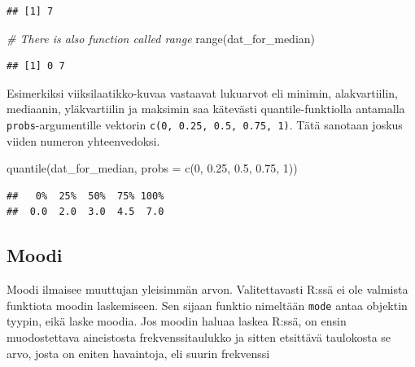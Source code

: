 \documentclass[
]{book}
\newenvironment{Shaded}{\begin{snugshade}}{\end{snugshade}}
\newcommand{\AttributeTok}[1]{\textcolor[rgb]{0.77,0.63,0.00}{#1}}
\newcommand{\CommentTok}[1]{\textcolor[rgb]{0.56,0.35,0.01}{\textit{#1}}}
\newcommand{\DecValTok}[1]{\textcolor[rgb]{0.00,0.00,0.81}{#1}}
\newcommand{\FloatTok}[1]{\textcolor[rgb]{0.00,0.00,0.81}{#1}}
\newcommand{\FunctionTok}[1]{\textcolor[rgb]{0.00,0.00,0.00}{#1}}
\newcommand{\NormalTok}[1]{#1}
\begin{document}
\begin{verbatim}
## [1] 7
\end{verbatim}

\begin{Shaded}
\begin{Highlighting}[]
\CommentTok{\# There is also function called range}
\FunctionTok{range}\NormalTok{(dat\_for\_median)}
\end{Highlighting}
\end{Shaded}

\begin{verbatim}
## [1] 0 7
\end{verbatim}

Esimerkiksi viiksilaatikko-kuvaa vastaavat lukuarvot eli minimin, alakvartiilin, mediaanin, yläkvartiilin ja maksimin saa kätevästi quantile-funktiolla antamalla \texttt{probs}-argumentille vektorin \texttt{c(0,\ 0.25,\ 0.5,\ 0.75,\ 1)}. Tätä sanotaan joskus viiden numeron yhteenvedoksi.

\begin{Shaded}
\begin{Highlighting}[]
\FunctionTok{quantile}\NormalTok{(dat\_for\_median, }\AttributeTok{probs =} \FunctionTok{c}\NormalTok{(}\DecValTok{0}\NormalTok{, }\FloatTok{0.25}\NormalTok{, }\FloatTok{0.5}\NormalTok{, }\FloatTok{0.75}\NormalTok{, }\DecValTok{1}\NormalTok{))}
\end{Highlighting}
\end{Shaded}

\begin{verbatim}
##   0%  25%  50%  75% 100% 
##  0.0  2.0  3.0  4.5  7.0
\end{verbatim}

\hypertarget{moodi}{%
\subsection{Moodi}\label{moodi}}

Moodi ilmaisee muuttujan yleisimmän arvon. Valitettavasti R:ssä ei ole valmista funktiota moodin laskemiseen. Sen sijaan funktio nimeltään \texttt{mode} antaa objektin tyypin, eikä laske moodia. Jos moodin haluaa laskea R:ssä, on ensin muodostettava aineistosta frekvenssitaulukko ja sitten etsittävä taulokosta se arvo, josta on eniten havaintoja, eli suurin frekvenssi
\end{document}
